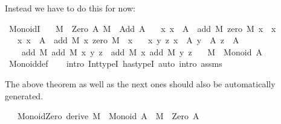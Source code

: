 \begin{isabellebody}
\begin{isamarkuptext}
Instead we have to do this for now:%
\end{isamarkuptext}\isamarkuptrue%
\isamarkupfalse%
\ MonoidI{\isacharcolon}{\kern0pt}\isanewline
\ \ \ {\isachardoublequoteopen}M\ {\isacharcolon}{\kern0pt}\ Zero\ A{\isachardoublequoteclose}\ {\isachardoublequoteopen}M\ {\isacharcolon}{\kern0pt}\ Add\ A{\isachardoublequoteclose}\isanewline
\ \ \ {\isachardoublequoteopen}{\isasymAnd}x{\isachardot}{\kern0pt}\ x\ {\isacharcolon}{\kern0pt}\ A\ {\isasymLongrightarrow}\ add\ M\ {\isacharparenleft}{\kern0pt}zero\ M{\isacharparenright}{\kern0pt}\ x\ {\isacharequal}{\kern0pt}\ x{\isachardoublequoteclose}\isanewline
\ \ \ {\isachardoublequoteopen}{\isasymAnd}x{\isachardot}{\kern0pt}\ x\ {\isacharcolon}{\kern0pt}\ A\ {\isasymLongrightarrow}\ add\ M\ x\ {\isacharparenleft}{\kern0pt}zero\ M{\isacharparenright}{\kern0pt}\ {\isacharequal}{\kern0pt}\ x{\isachardoublequoteclose}\isanewline
\ \ \ {\isachardoublequoteopen}{\isasymAnd}x\ y\ z{\isachardot}{\kern0pt}\ {\isasymlbrakk}x\ {\isacharcolon}{\kern0pt}\ A{\isacharsemicolon}{\kern0pt}\ y\ {\isacharcolon}{\kern0pt}\ A{\isacharsemicolon}{\kern0pt}\ z\ {\isacharcolon}{\kern0pt}\ A{\isasymrbrakk}\ {\isasymLongrightarrow}\isanewline
\ \ \ \ add\ M\ {\isacharparenleft}{\kern0pt}add\ M\ x\ y{\isacharparenright}{\kern0pt}\ z\ {\isacharequal}{\kern0pt}\ add\ M\ x\ {\isacharparenleft}{\kern0pt}add\ M\ y\ z{\isacharparenright}{\kern0pt}{\isachardoublequoteclose}\isanewline
\ \ \ {\isachardoublequoteopen}M\ {\isacharcolon}{\kern0pt}\ Monoid\ A{\isachardoublequoteclose}\isanewline
%
\isadelimproof
\ \ %
\endisadelimproof
%
\isatagproof
{}\isamarkupfalse%
\ Monoid{\isacharunderscore}{\kern0pt}def\isanewline
\ \ \isamarkupfalse%
\ {\isacharparenleft}{\kern0pt}intro\ Int{\isacharunderscore}{\kern0pt}typeI\ has{\isacharunderscore}{\kern0pt}typeI{\isacharparenright}{\kern0pt}\ {\isacharparenleft}{\kern0pt}auto\ intro{\isacharcolon}{\kern0pt}\ assms{\isacharparenright}{\kern0pt}%
\endisatagproof
{\isafoldproof}%
%
\isadelimproof
%
\endisadelimproof
%
\begin{isamarkuptext}%
The above theorem as well as the next ones should also be automatically
generated.%
\end{isamarkuptext}\isamarkuptrue%
\isamarkupfalse%
\isanewline
\ \ \ Monoid{\isacharunderscore}{\kern0pt}Zero\ {\isacharbrackleft}{\kern0pt}derive{\isacharbrackright}{\kern0pt}{\isacharcolon}{\kern0pt}\ {\isachardoublequoteopen}M\ {\isacharcolon}{\kern0pt}\ Monoid\ A\ {\isasymLongrightarrow}\ M\ {\isacharcolon}{\kern0pt}\ Zero\ A{\isachardoublequoteclose}\isanewline

\end{isabellebody}
